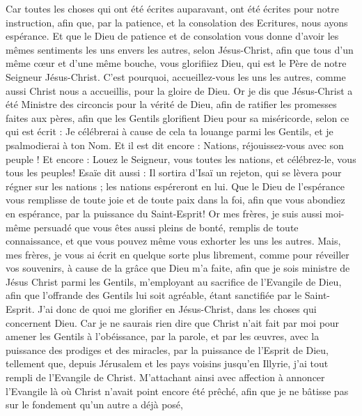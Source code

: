 \begin{multicols}{2}
Car toutes les choses qui ont été écrites auparavant, ont été écrites pour notre instruction, afin que, par la patience, et la consolation des Ecritures, nous ayons espérance.
Et que le Dieu de patience et de consolation vous donne d'avoir les mêmes sentiments les uns envers les autres, selon Jésus-Christ,
afin que tous d'un même cœur et d'une même bouche, vous glorifiiez Dieu, qui est le Père de notre Seigneur Jésus-Christ.
C'est pourquoi, accueillez-vous les uns les autres, comme aussi Christ nous a accueillis, pour la gloire de Dieu.
Or je dis que Jésus-Christ a été Ministre des circoncis pour la vérité de Dieu, afin de ratifier les promesses faites aux pères,
afin que les Gentils glorifient Dieu pour sa miséricorde, selon ce qui est écrit : Je célébrerai à cause de cela ta louange parmi les Gentils, et je psalmodierai à ton Nom. Et il est dit encore :
Nations, réjouissez-vous avec son peuple !
Et encore : Louez le Seigneur, vous toutes les nations, et célébrez-le, vous tous les peuples! Esaïe dit aussi :
Il sortira d'Isaï un rejeton, qui se lèvera pour régner sur les nations ; les nations espéreront en lui.
Que le Dieu de l'espérance vous remplisse de toute joie et de toute paix dans la foi, afin que vous abondiez en espérance, par la puissance du Saint-Esprit!
 Or mes frères, je suis aussi moi-même persuadé que vous êtes aussi pleins de bonté, remplis de toute connaissance, et que vous pouvez même vous exhorter les uns les autres.
Mais, mes frères, je vous ai écrit en quelque sorte plus librement, comme pour réveiller vos souvenirs, à cause de la grâce que Dieu m'a faite,
afin que je sois ministre de Jésus Christ parmi les Gentils, m'employant au sacrifice de l'Evangile de Dieu, afin que l'offrande des Gentils lui soit agréable, étant sanctifiée par le Saint-Esprit.
J'ai donc de quoi me glorifier en Jésus-Christ, dans les choses qui concernent Dieu.
Car je ne saurais rien dire que Christ n'ait fait par moi pour amener les Gentils à l'obéissance, par la parole, et par les œuvres,
avec la puissance des prodiges et des miracles, par la puissance de l'Esprit de Dieu, tellement que, depuis Jérusalem et les pays voisins jusqu'en Illyrie, j'ai tout rempli de l'Evangile de Christ.
M'attachant ainsi avec affection à annoncer l'Evangile là où Christ n'avait point encore été prêché, afin que je ne bâtisse pas sur le fondement qu'un autre a déjà posé, 

\end{multicols}
